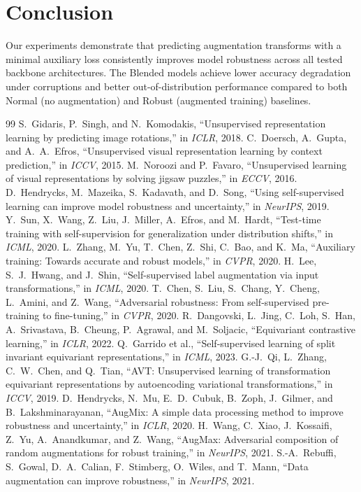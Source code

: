 \documentclass[11pt,a4paper]{article}
\begin{document}
\section{Conclusion}
Our experiments demonstrate that predicting augmentation transforms with a minimal auxiliary loss consistently improves model robustness across all tested backbone architectures. The Blended models achieve lower accuracy degradation under corruptions and better out-of-distribution performance compared to both Normal (no augmentation) and Robust (augmented training) baselines.

\begin{thebibliography}{99}
 S.~Gidaris, P.~Singh, and N.~Komodakis, ``Unsupervised representation learning by predicting image rotations,'' in \emph{ICLR}, 2018.
 C.~Doersch, A.~Gupta, and A.~A.~Efros, ``Unsupervised visual representation learning by context prediction,'' in \emph{ICCV}, 2015.
 M.~Noroozi and P.~Favaro, ``Unsupervised learning of visual representations by solving jigsaw puzzles,'' in \emph{ECCV}, 2016.
 D.~Hendrycks, M.~Mazeika, S.~Kadavath, and D.~Song, ``Using self-supervised learning can improve model robustness and uncertainty,'' in \emph{NeurIPS}, 2019.
 Y.~Sun, X.~Wang, Z.~Liu, J.~Miller, A.~Efros, and M.~Hardt, ``Test-time training with self-supervision for generalization under distribution shifts,'' in \emph{ICML}, 2020.
 L.~Zhang, M.~Yu, T.~Chen, Z.~Shi, C.~Bao, and K.~Ma, ``Auxiliary training: Towards accurate and robust models,'' in \emph{CVPR}, 2020.
 H.~Lee, S.~J.~Hwang, and J.~Shin, ``Self-supervised label augmentation via input transformations,'' in \emph{ICML}, 2020.
 T.~Chen, S.~Liu, S.~Chang, Y.~Cheng, L.~Amini, and Z.~Wang, ``Adversarial robustness: From self-supervised pre-training to fine-tuning,'' in \emph{CVPR}, 2020.
 R.~Dangovski, L.~Jing, C.~Loh, S.~Han, A.~Srivastava, B.~Cheung, P.~Agrawal, and M.~Soljacic, ``Equivariant contrastive learning,'' in \emph{ICLR}, 2022.
 Q.~Garrido et al., ``Self-supervised learning of split invariant equivariant representations,'' in \emph{ICML}, 2023.
 G.-J.~Qi, L.~Zhang, C.~W.~Chen, and Q.~Tian, ``AVT: Unsupervised learning of transformation equivariant representations by autoencoding variational transformations,'' in \emph{ICCV}, 2019.
 D.~Hendrycks, N.~Mu, E.~D.~Cubuk, B.~Zoph, J.~Gilmer, and B.~Lakshminarayanan, ``AugMix: A simple data processing method to improve robustness and uncertainty,'' in \emph{ICLR}, 2020.
 H.~Wang, C.~Xiao, J.~Kossaifi, Z.~Yu, A.~Anandkumar, and Z.~Wang, ``AugMax: Adversarial composition of random augmentations for robust training,'' in \emph{NeurIPS}, 2021.
 S.-A.~Rebuffi, S.~Gowal, D.~A.~Calian, F.~Stimberg, O.~Wiles, and T.~Mann, ``Data augmentation can improve robustness,'' in \emph{NeurIPS}, 2021.
\end{thebibliography}
\end{document}
